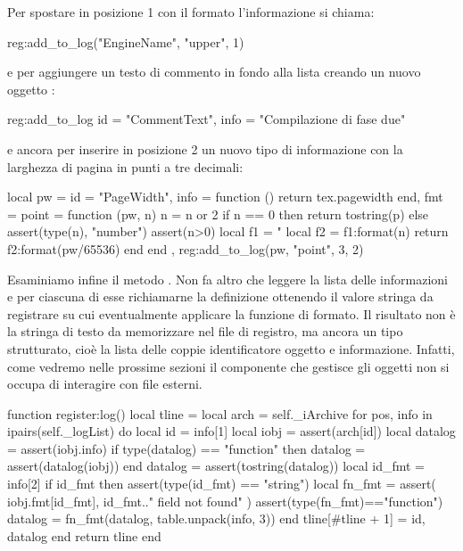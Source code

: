 Per spostare in posizione 1 con il formato  l'informazione
 si chiama:
\begin{lines}
reg:add_to_log({"EngineName", "upper"}, 1)
\end{lines}
e per aggiungere un testo di commento in fondo alla lista creando un nuovo
oggetto :
\begin{lines}
reg:add_to_log{
    id = "CommentText",
    info = "Compilazione di fase due"
}
\end{lines}
e ancora per inserire in posizione 2 un nuovo tipo di informazione con la
larghezza di pagina in punti a tre decimali:
\begin{lines}
local pw = {
    id = "PageWidth",
    info = function () return tex.pagewidth end,
    fmt = {
        point = function (pw, n)
            n = n or 2
            if n == 0 then
                return tostring(p)
            else
                assert(type(n), "number")
                assert(n>0)
                local f1 = "%
                local f2 = f1:format(n)
                return f2:format(pw/65536) 
            end
        end
    },
}
reg:add_to_log({pw, "point", 3}, 2)
\end{lines}

Esaminiamo infine il metodo . Non fa altro che leggere la lista delle
informazioni e per ciascuna di esse richiamarne la definizione ottenendo il
valore stringa da registrare su cui eventualmente applicare la funzione di
formato. Il risultato non è la stringa di testo da memorizzare nel file di
registro, ma ancora un tipo strutturato, cioè la lista delle coppie
identificatore oggetto e informazione. Infatti, come vedremo nelle prossime
sezioni il componente che gestisce gli oggetti  non si occupa di
interagire con file esterni.
\begin{lines}
function register:log()
    local tline = {}
    local arch = self._iArchive
    for pos, info in ipairs(self._logList) do
        local id = info[1]
        local iobj = assert(arch[id])
        local datalog = assert(iobj.info)
        if type(datalog) == "function" then
            datalog = assert(datalog(iobj))
        end
        datalog = assert(tostring(datalog))
        local id_fmt = info[2]
        if id_fmt then
            assert(type(id_fmt) == "string")
            local fn_fmt = assert(
                iobj.fmt[id_fmt], id_fmt.." field not found"
            )
            assert(type(fn_fmt)=="function")
            datalog = fn_fmt(datalog, table.unpack(info, 3))
        end
        tline[#tline + 1] = {id, datalog}
    end
    return tline
end
\end{lines}

